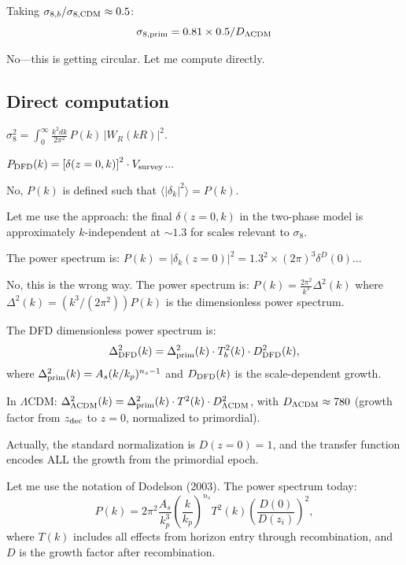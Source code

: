 \documentclass[11pt]{article}
\newcommand{\LCDM}{$\Lambda$CDM}
\begin{document}
Taking $\sigma_{8,b}/\sigma_{8,\rm CDM} \approx 0.5$:
\begin{equation}
\sigma_{8,\rm prim} = 0.81\times 0.5/D_{\Lambda\rm CDM}
\end{equation}

No---this is getting circular. Let me compute directly.

\subsection{Direct computation}

$\sigma_8^2 = \int_0^\infty \frac{k^2 dk}{2\pi^2}\,P(k)\,|W_R(kR)|^2$.

$P_{\rm DFD}(k) = \left[\delta(z=0,k)\right]^2\cdot V_{\rm survey}$...

No, $P(k)$ is defined such that $\langle|\delta_k|^2\rangle = P(k)$.

Let me use the approach: the final $\delta(z=0, k)$ in the two-phase
model is approximately $k$-independent at $\sim 1.3$ for scales
relevant to $\sigma_8$.

The power spectrum is:
$P(k) = |\delta_k(z=0)|^2 = 1.3^2\times (2\pi)^3\delta^D(0)$...

No, this is the wrong way. The power spectrum is:
$P(k) = \frac{2\pi^2}{k^3}\Delta^2(k)$
where $\Delta^2(k) = (k^3/(2\pi^2))P(k)$ is the dimensionless
power spectrum.

The DFD dimensionless power spectrum is:
\begin{equation}
\Delta^2_{\rm DFD}(k) = \Delta^2_{\rm prim}(k)\cdot T_b^2(k)
\cdot D_{\rm DFD}^2(k),
\end{equation}
where $\Delta^2_{\rm prim}(k) = A_s(k/k_p)^{n_s-1}$ and
$D_{\rm DFD}(k)$ is the scale-dependent growth.

In \LCDM:
$\Delta^2_{\Lambda\rm CDM}(k) = \Delta^2_{\rm prim}(k)\cdot T^2(k)
\cdot D^2_{\Lambda\rm CDM}$,
with $D_{\Lambda\rm CDM} \approx 780$ (growth factor from $z_{\rm dec}$
to $z = 0$, normalized to primordial).

Actually, the standard normalization is $D(z=0) = 1$, and the transfer
function encodes ALL the growth from the primordial epoch.

Let me use the notation of Dodelson (2003). The power spectrum today:
\begin{equation}
P(k) = 2\pi^2\frac{A_s}{k_p^3}\left(\frac{k}{k_p}\right)^{n_s}
T^2(k)\left(\frac{D(0)}{D(z_i)}\right)^2,
\end{equation}
where $T(k)$ includes all effects from horizon entry through
recombination, and $D$ is the growth factor after recombination.
\end{document}
